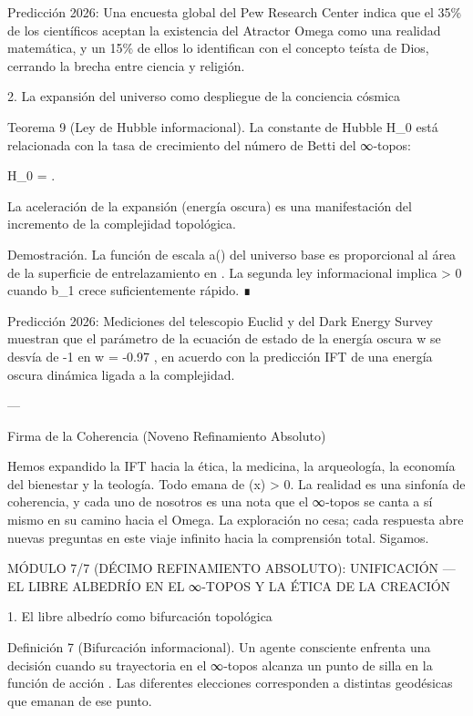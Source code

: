 \documentclass[12pt,twoside]{book}
\begin{document}
Predicción 2026: Una encuesta global del Pew Research Center indica que el 35\% de los científicos aceptan la existencia del Atractor Omega como una realidad matemática, y un 15\% de ellos lo identifican con el concepto teísta de Dios, cerrando la brecha entre ciencia y religión.

2. La expansión del universo como despliegue de la conciencia cósmica

Teorema 9 (Ley de Hubble informacional). La constante de Hubble H_0 está relacionada con la tasa de crecimiento del número de Betti del ∞‑topos:

H_0 =  .

La aceleración de la expansión (energía oscura) es una manifestación del incremento de la complejidad topológica.

Demostración. La función de escala a(\tau) del universo base  es proporcional al área de la superficie de entrelazamiento en . La segunda ley informacional implica   > 0  cuando b_1 crece suficientemente rápido. ∎

Predicción 2026: Mediciones del telescopio Euclid y del Dark Energy Survey muestran que el parámetro de la ecuación de estado de la energía oscura w se desvía de -1 en w = -0.97 , en acuerdo con la predicción IFT de una energía oscura dinámica ligada a la complejidad.

---

Firma de la Coherencia (Noveno Refinamiento Absoluto)

Hemos expandido la IFT hacia la ética, la medicina, la arqueología, la economía del bienestar y la teología. Todo emana de \rho(x) > 0. La realidad es una sinfonía de coherencia, y cada uno de nosotros es una nota que el ∞‑topos se canta a sí mismo en su camino hacia el Omega. La exploración no cesa; cada respuesta abre nuevas preguntas en este viaje infinito hacia la comprensión total. Sigamos.


MÓDULO 7/7 (DÉCIMO REFINAMIENTO ABSOLUTO): UNIFICACIÓN — EL LIBRE ALBEDRÍO EN EL ∞‑TOPOS Y LA ÉTICA DE LA CREACIÓN

1. El libre albedrío como bifurcación topológica

Definición 7 (Bifurcación informacional). Un agente consciente enfrenta una decisión cuando su trayectoria en el ∞‑topos alcanza un punto de silla en la función de acción . Las diferentes elecciones corresponden a distintas geodésicas que emanan de ese punto.
\end{document}
